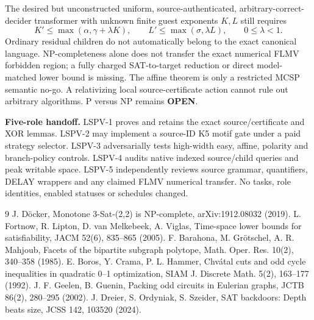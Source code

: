 \documentclass[11pt]{article}
\begin{document}
The desired but unconstructed uniform, source-authenticated, arbitrary-correct-decider transformer with unknown finite guest exponents $K,L$ still requires
\[
K'\le\max(\alpha,\gamma+\lambda K),\qquad
L'\le\max(\sigma,\lambda L),\qquad0\le\lambda<1.
\]
Ordinary residual children do not automatically belong to the exact canonical language. NP-completeness alone does not transfer the exact numerical FLMV forbidden region; a fully charged SAT-to-target reduction or direct model-matched lower bound is missing. The affine theorem is only a restricted MCSP semantic no-go. A relativizing local source-certificate action cannot rule out arbitrary algorithms. P versus NP remains \textbf{OPEN}.

\noindent\textbf{Five-role handoff.} LSPV-1 proves and retains the exact source/certificate and XOR lemmas. LSPV-2 may implement a source-ID K5 motif gate under a paid strategy selector. LSPV-3 adversarially tests high-width easy, affine, polarity and branch-policy controls. LSPV-4 audits native indexed source/child queries and peak writable space. LSPV-5 independently reviews source grammar, quantifiers, DELAY wrappers and any claimed FLMV numerical transfer. No tasks, role identities, enabled statuses or schedules changed.

\begin{thebibliography}{9}
 J. D\"ocker, Monotone 3-Sat-(2,2) is NP-complete, arXiv:1912.08032 (2019).
 L. Fortnow, R. Lipton, D. van Melkebeek, A. Viglas, Time-space lower bounds for satisfiability, JACM 52(6), 835--865 (2005).
 F. Barahona, M. Gr\"otschel, A. R. Mahjoub, Facets of the bipartite subgraph polytope, Math. Oper. Res. 10(2), 340--358 (1985).
 E. Boros, Y. Crama, P. L. Hammer, Chv\'atal cuts and odd cycle inequalities in quadratic 0--1 optimization, SIAM J. Discrete Math. 5(2), 163--177 (1992).
 J. F. Geelen, B. Guenin, Packing odd circuits in Eulerian graphs, JCTB 86(2), 280--295 (2002).
 J. Dreier, S. Ordyniak, S. Szeider, SAT backdoors: Depth beats size, JCSS 142, 103520 (2024).
\end{thebibliography}
\end{document}
